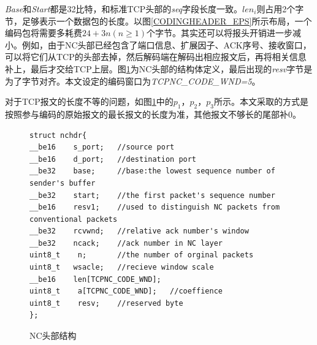 \par
\emph{Base}和\emph{Start}都是32比特，和标准TCP头部的\emph{seq}字段长度一致。$len_{i}$则占用2个字节，足够表示一个数据包的长度。以图\ref{CODINGHEADER_EPS}所示布局，一个编码包将需要多耗费$24+3n\left(n \ge 1\right)$个字节。其实还可以将报头开销进一步减小。例如，由于NC头部已经包含了端口信息、扩展因子、ACK序号、接收窗口，可以将它们从TCP的头部去掉，然后解码端在解码出相应报文后，再将相关信息补上，最后才交给TCP上层。图\ref{NCHEAD}为NC头部的结构体定义，最后出现的\emph{resv}字节是为了字节对齐。本文设定的编码窗口为\emph{TCPNC\_CODE\_WND=5}。
\par
对于TCP报文的长度不等的问题，如图\ref{NCHEAD}中的$p_{1}$，$p_{2}$，$p_{3}$所示。本文采取的方式是按照参与编码的原始报文的最长报文的长度为准，其他报文不够长的尾部补0。
\begin{figure}
	\begin{lstlisting}[language={[ANSI]C}]
struct nchdr{
__be16    s_port;	//source port
__be16    d_port;	//destination port
__be32    base;		//base:the lowest sequence number of sender's buffer
__be32    start;	//the first packet's sequence number
__be16    resv1;    //used to distinguish NC packets from conventional packets
__be32    rcvwnd;   //relative ack number's window
__be32    ncack;	//ack number in NC layer
uint8_t    n;		//the number of orginal packets
uint8_t   wsacle;	//recieve window scale
__be16    len[TCPNC_CODE_WND];
uint8_t    a[TCPNC_CODE_WND];	//coeffience
uint8_t    resv;	//reserved byte
};
	\end{lstlisting}
	\caption{NC头部结构}
	\label{NCHEAD}
\end{figure}
